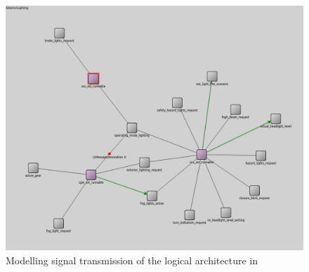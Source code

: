 \begin{figure}[htb]
    \centering
    \includegraphics[width=\textwidth]{images/logical_sim.png}
    \caption{Modelling signal transmission of the logical architecture in \omnet}
    \label{fig:logical_sim}
\end{figure}